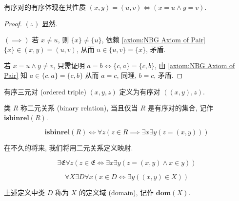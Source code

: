 \begin{lemma}
    有序对的有序体现在其性质 \((x,y) = (u,v) \iff (x = u \land y = v)\).

    \begin{proof}
        \((\therefore)\) 显然.

        \((\implies)\) 若 \(x \neq u\), 则 \(\{x\} \neq \{u\}\), 依赖 \ref{axiom:NBG Axiom of Pair}
        \(\{x\} \in (x,y) = (u,v)\), 从而 \(u \in \{u, v\} = \{x\}\), 矛盾.

        若 \(x = u \land y \neq v\), 只需证明 \(a = b \iff \{c,a\} = \{c,b\}\), 
        由 \ref{axiom:NBG Axiom of Pair} 知 \(a \in \{c,a\} = \{c,b\}\) 从而 \(a = c\), 同理, 
        \(b = c\), 矛盾.
    \end{proof}
\end{lemma}

\begin{definition}[有序三元对]
    \label {definition:ordered triple}
    有序三元对 (ordered triple) \((x,y,z)\) 定义为有序对 \(((x,y),z)\).
\end{definition}

\begin{definition}[二元关系]
    \label {definition:binary relation}
    类 \(R\) 称二元关系 (binary relation), 当且仅当 \(R\) 是有序对的集合, 记作 \(\mathbf{isbinrel} (R)\).

    \[
        \mathbf{isbinrel} (R) \iff \forall z (z \in R \implies \exists x \exists y (z = (x,y)))
    \]
\end{definition}

在不久的将来, 我们将用二元关系定义映射.

\begin{axiom}
    \label {axiom:NBG Axiom of Membership}
    \[
        \exists \mathfrak{E} \forall z (z \in \mathfrak{E} \iff \exists x \exists y (z = (x,y) \land x \in y))
    \]
\end{axiom}

\begin{axiom}
    \label {axiom:NBG Axiom of Domain}
    \[
        \forall X \exists D \forall x (x \in D \iff \exists y ((x,y) \in X))
    \]
\end{axiom}

\begin{definition}
    \label {definition:domain}
    上述定义中类 \(D\) 称为 \(X\) 的定义域 (domain), 记作 \(\mathbf{dom} (X)\).
\end{definition}

